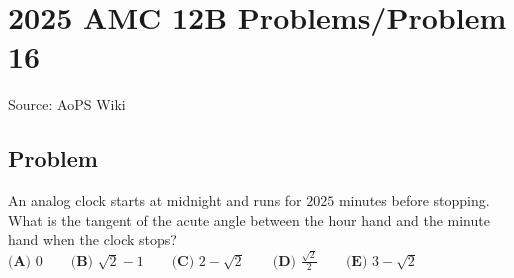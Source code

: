 \documentclass[12pt]{article}
\begin{document}
\section*{{2025 AMC 12B Problems/Problem 16}}
Source: AoPS Wiki

\subsection*{Problem}
An analog clock starts at midnight and runs for $2025$ minutes before stopping. What is the tangent of the acute angle between the hour hand and the minute hand when the clock stops? $\textbf{(A) } 0 \qquad \textbf{(B) } \sqrt{2}-1 \qquad \textbf{(C) } 2-\sqrt{2} \qquad \textbf{(D) } \frac{\sqrt{2}}{2} \qquad \textbf{(E) } 3-\sqrt{2}$
\end{document}
